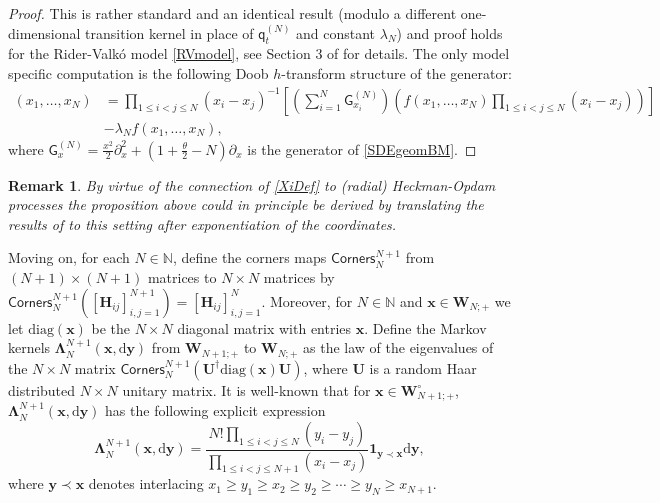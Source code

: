 \documentclass[]{article}
\newtheorem{rmk}[thm]{Remark}
\begin{document}
\begin{proof}
 This is rather standard and an identical result (modulo a different one-dimensional transition kernel in place of $\mathsf{q}_t^{(N)}$ and constant $\lambda_N$) and proof holds for the Rider-Valk\'{o} model \eqref{RVmodel}, see Section 3 of \cite{AM24} for details. The only model specific computation is the following Doob $h$-transform structure of the generator:
 \begin{align*}
 [\mathsf{L}_Nf](x_1,\dots,x_N)&=\prod_{1\le i<j\le N}(x_i-x_j)^{-1}\left[\left(\sum_{i=1}^N\mathsf{G}_{x_i}^{(N)}\right) \left(f(x_1,\dots,x_N)\prod_{1\le i<j\le N}(x_i-x_j)\right)\right]\\
 &-\lambda_N f(x_1,\dots,x_N),
 \end{align*}
 where $\mathsf{G}_x^{(N)}=\frac{x^2}{2}\partial_x^2+(1+\frac{\theta}{2}-N)\partial_x$ is the generator of \eqref{SDEgeomBM}.
\end{proof}


\begin{rmk}
By virtue of the connection of \eqref{XiDef} to (radial) Heckman-Opdam processes \cite{Heckman-Opdam} the proposition above could in principle be derived by translating the results of \cite{Heckman-Opdam} to this setting after exponentiation of the coordinates.
\end{rmk}

Moving on, for each $N \in \mathbb{N}$, define the corners maps $\mathsf{Corners}_N^{N+1}$ from $(N+1)\times (N+1)$ matrices to $N \times N$ matrices by $\mathsf{Corners}_{N}^{N+1}([\mathbf{H}_{ij}]_{i,j=1}^{N+1})=[\mathbf{H}_{ij}]_{i,j=1}^N$. Moreover, for $N \in\mathbb{N}$ and $\mathbf{x}\in \mathbf{W}_{N;+}$ we let $\mathrm{diag}(\mathbf{x})$ be the $N \times N$  diagonal matrix with entries $\mathbf{x}$. Define the Markov kernels $\boldsymbol{\Lambda}_N^{N+1}(\mathbf{x},\mathrm{d}\mathbf{y})$ from $\mathbf{W}_{N+1;+}$ to $\mathbf{W}_{N;+}$ as the law of the eigenvalues of the $N \times N$ matrix $\mathsf{Corners}_N^{N+1}(\mathbf{U}^\dag \mathrm{diag}(\mathbf{x})\mathbf{U})$, where $\mathbf{U}$ is a random Haar distributed $N \times N$ unitary matrix. It is well-known that for $\mathbf{x}\in \mathbf{W}_{N+1;+}^\circ$, $\boldsymbol{\Lambda}_{N}^{N+1}(\mathbf{x},\mathrm{d}\mathbf{y})$ has the following explicit expression
\begin{equation}\label{ExplicitMarkovKernel}
\boldsymbol{\Lambda}_{N}^{N+1}(\mathbf{x},\mathrm{d}\mathbf{y})=\frac{N!\prod_{1\le i <j \le N}(y_i-y_j)}{\prod_{1\le i<j \le N+1}(x_i-x_j)}\mathbf{1}_{\mathbf{y}\prec \mathbf{x}} \mathrm{d}\mathbf{y},
\end{equation}
where $\mathbf{y}\prec \mathbf{x}$ denotes interlacing $x_1\ge y_1 \ge x_2 \ge y_2 \ge \cdots \ge y_N \ge x_{N+1}$.
\end{document}
